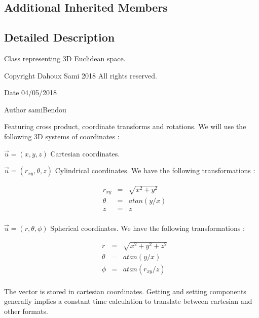\subsection*{Additional Inherited Members}


\subsection{Detailed Description}
Class representing 3D Euclidean space. 

\begin{DoxyCopyright}{Copyright}
Dahoux Sami 2018 All rights reserved. 
\end{DoxyCopyright}
\begin{DoxyDate}{Date}
04/05/2018 
\end{DoxyDate}
\begin{DoxyAuthor}{Author}
sami\+Bendou
\end{DoxyAuthor}
Featuring cross product, coordinate transforms and rotations. We will use the following 3D systems of coordinates \+:


\begin{DoxyItemize}
\item $ \vec{u} = (x, y, z) $ Cartesian coordinates.
\item $ \vec{u} = (r_{xy}, \theta, z) $ Cylindrical coordinates. We have the following transformations \+:
\end{DoxyItemize}

\[ \begin{align*} & r_{xy} & = & \sqrt{x^2 + y^2} \\ & \theta & = & atan(y / x) \\ & z & = & z \\ \end{align*} \]


\begin{DoxyItemize}
\item $ \vec{u} = (r, \theta, \phi) $ Spherical coordinates. We have the following transformations \+:
\end{DoxyItemize}

\[ \begin{align*} & r & = & \sqrt{x^2 + y^2 + z^2} \\ & \theta & = & atan(y / x) \\ & \phi & = & atan(r_{xy} / z) \\ \end{align*} \]

The vector is stored in cartesian coordinates. Getting and setting components generally implies a constant time calculation to translate between cartesian and other formats.

